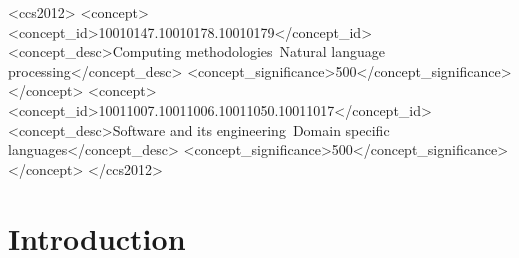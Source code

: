 \documentclass[manuscript,screen]{acmart}
\begin{document}
\begin{abstract}
\end{abstract}

\acresetall{}

\begin{CCSXML}
<ccs2012>
<concept>
<concept_id>10010147.10010178.10010179</concept_id>
<concept_desc>Computing methodologies~Natural language processing</concept_desc>
<concept_significance>500</concept_significance>
</concept>
<concept>
<concept_id>10011007.10011006.10011050.10011017</concept_id>
<concept_desc>Software and its engineering~Domain specific languages</concept_desc>
<concept_significance>500</concept_significance>
</concept>
</ccs2012>
\end{CCSXML}




\maketitle


\section{Introduction}
\end{document}
